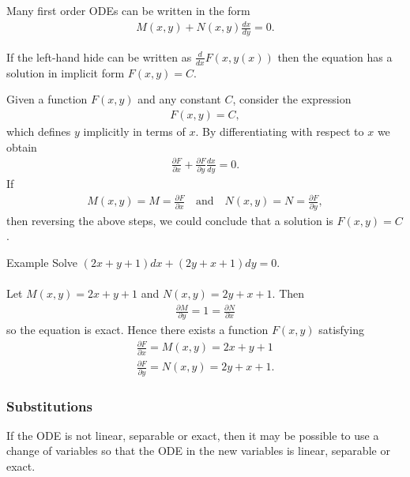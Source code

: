 \documentclass{report}
\begin{document}
		Many first order ODEs can be written in the form
		\begin{align*}
			M(x,y) + N(x,y) \frac{dx}{dy} = 0.
		\end{align*}

		If the left-hand hide can be written as $\frac{d}{dx} F(x,y(x))$ then the equation has a solution in implicit form $F(x,y) = C$.

		Given a function $F(x,y)$ and any constant $C$, consider the expression
		\begin{align*}
			F(x,y) = C,
		\end{align*}
		which defines $y$ implicitly in terms of $x$. By differentiating with respect to $x$ we obtain
		\begin{align*}
			\frac{\partial F }{\partial x} + \frac{\partial F }{\partial y} \frac{dx}{dy} = 0.
		\end{align*}
		If
		\begin{align*}
			M(x,y) = M = \frac{\partial F}{\partial x} \quad \text{and} \quad N(x,y) = N = \frac{\partial F}{\partial y},
		\end{align*}
		then reversing the above steps, we could conclude that a solution is $F(x,y) = C$.

		\begin{question}{Example}
			Solve $(2x + y + 1)dx + (2y + x + 1)dy = 0$.
			\\ \\
			Let $M(x,y) = 2x + y + 1$ and $N(x,y) = 2y + x + 1$.
			Then
			\begin{align*}
				\frac{\partial M}{\partial y} = 1 = \frac{\partial N}{\partial x}
			\end{align*}
			so the equation is exact. Hence there exists a function $F(x,y)$ satisfying
			\begin{align*}
				\frac{\partial F}{\partial x} = M(x,y) = 2x + y + 1	\\
				\frac{\partial F}{\partial y} = N(x,y) = 2y + x + 1.
			\end{align*}
		\end{question}
		
		\subsubsection{Substitutions}

			If the ODE is not linear, separable or exact, then it may be possible to use a change of variables so that the ODE in the new variables is linear, separable or exact.
\end{document}
